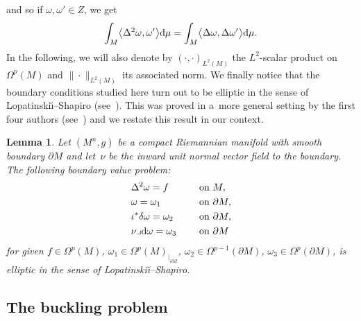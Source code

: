 \documentclass[pdftex]{sigma}
\numberwithin{equation}{section}
\newtheorem{Lemma}[Theorem]{Lemma}
\theoremstyle{definition}
\begin{document}
and so if $\omega,\omega'\in Z$, we get
\begin{equation}\label{eq:partialintDeltacons}
\int_M\bigl\langle\Delta^2\omega,\omega'\bigr\rangle {\rm d}\mu=\int_M\bigl\langle\Delta \omega,\Delta\omega'\bigr\rangle {\rm d}\mu.
\end{equation}
In the following, we will also denote by $(\cdot,\cdot)_{L^2(M)}$ the $L^2$-scalar product on $\Omega^p(M)$ and $\|\cdot\|_{L^2(M)}$ its associated norm.
We finally notice that the boundary conditions studied here turn out to be elliptic in the sense of Lopatinski\u{\i}--Shapiro (see~\cite[Definition~1.6.1]{Sc}). This was proved in a~more general setting by the first four authors (see~\cite[Lemma~6.1]{EGHM}) and we restate this result in our context.
\begin{Lemma}\label{elliptic_problem}
Let $(M^n,g)$ be a compact Riemannian manifold with smooth boundary $\partial M$ and let~$\nu$ be the inward unit normal vector field to the boundary. The following boundary value problem:
\[
\begin{aligned}
&\Delta^2\omega=f\ \quad &&\textrm{on }M,\\
&\omega = \omega_1 \ \quad && \textrm{on }\partial M,\\
&\iota^*\delta\omega =\omega_2\ \quad &&\textrm{on }\partial M,\\
&\nu\lrcorner {\rm d}\omega =\omega_3\ \quad && \textrm{on }\partial M
\end{aligned}
\]
for given $f\in\Omega^p(M)$, $\omega_1\in\Omega^p(M)_{|_{\partial M}}$, $\omega_2\in\Omega^{p-1}(\partial M)$, $\omega_3\in\Omega^p(\partial M)$, is elliptic in the sense of Lopatinski\u{\i}--Shapiro.
\end{Lemma}

\subsection{The buckling problem}
\end{document}
